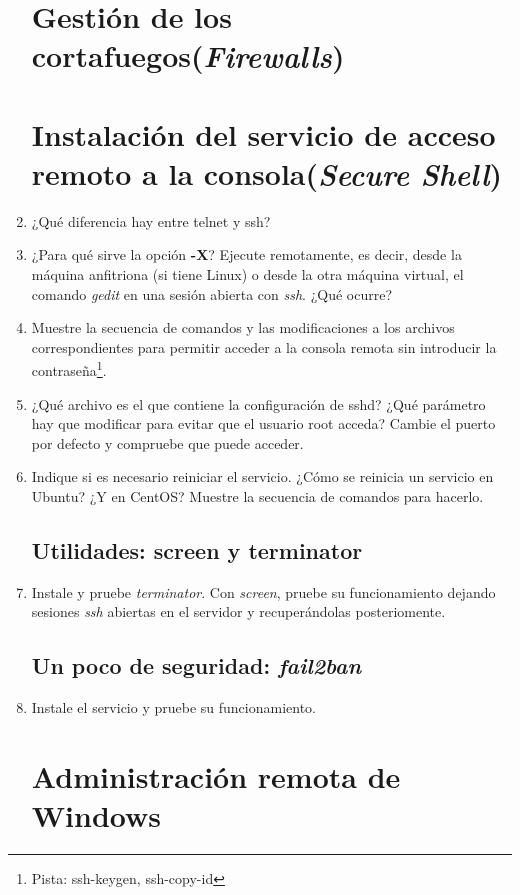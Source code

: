\documentclass[paper=a4, fontsize=11pt]{scrartcl} %
\numberwithin{equation}{section} %
\numberwithin{figure}{section} %
\numberwithin{table}{section} %
\begin{document}
\begin{enumerate}
	\section{Gestión de los cortafuegos(\textit{Firewalls})}
	\section{Instalación del servicio de acceso remoto a la consola(\textit{Secure Shell})}
	\item ¿Qué diferencia hay entre telnet y ssh?
	
	\item ¿Para qué sirve la opción \textbf{-X}? Ejecute remotamente, es decir, desde la máquina
	anfitriona (si tiene Linux) o desde la otra máquina virtual, el comando \textit{gedit} en una sesión
	abierta con \textit{ssh}. ¿Qué ocurre?
	
	\item Muestre la secuencia de comandos y las modificaciones a los archivos correspondientes para
	permitir acceder a la consola remota sin introducir la contraseña\footnote{Pista: ssh-keygen, ssh-copy-id}.

	\item ¿Qué archivo es el que contiene la configuración de sshd? ¿Qué parámetro hay que modificar
	para evitar que el usuario root acceda? Cambie el puerto por defecto y compruebe que puede acceder.

	\item Indique si es necesario reiniciar el servicio. ¿Cómo se reinicia un servicio en Ubuntu?
	¿Y en CentOS? Muestre la secuencia de comandos para hacerlo.
	
	\subsection{Utilidades: screen y terminator}
	\item Instale y pruebe \textit{terminator}. Con \textit{screen}, pruebe su funcionamiento dejando
	sesiones \textit{ssh} abiertas en el servidor y recuperándolas posteriomente.
	
	\subsection{Un poco de seguridad: \textit{fail2ban}}
	\item Instale el servicio y pruebe su funcionamiento.
	
	\section{Administración remota de Windows}

\end{enumerate}
\end{document}
